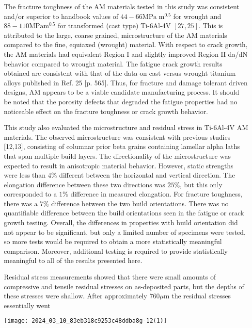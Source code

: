 \documentclass[10pt]{article}
\begin{document}
The fracture toughness of the AM materials tested in this study was consistent and/or superior to handbook values of $44-66 \mathrm{MPa}$ $\mathrm{m}^{0.5}$ for wrought and $88-110 \mathrm{MPa} \mathrm{m}^{0.5}$ for transformed (cast type) Ti-6Al-4V $[27,25]$. This is attributed to the large, coarse grained, microstructure of the AM materials compared to the fine, equiaxed (wrought) material. With respect to crack growth, the AM materials had equivalent Region I and slightly improved Region II da/dN behavior compared to wrought material. The fatigue crack growth results obtained are consistent with that of the data on cast versus wrought titanium alloys published in Ref. 25 [p. 565]. Thus, for fracture and damage tolerant driven designs, AM appears to be a viable candidate manufacturing process. It should be noted that the porosity defects that degraded the fatigue properties had no noticeable effect on the fracture toughness or crack growth behavior.

This study also evaluated the microstructure and residual stress in Ti-6Al-4V AM materials. The observed microstructure was consistent with previous studies [12,13], consisting of columnar prior beta grains containing lamellar alpha laths that span multiple build layers. The directionality of the microstructure was expected to result in anisotropic material behavior. However, static strengths were less than $4 \%$ different between the horizontal and vertical direction. The elongation difference between these two directions was $25 \%$, but this only corresponded to a $1 \%$ difference in measured elongation. For fracture toughness, there was a 7\% difference between the two build orientations. There was no quantifiable difference between the build orientations seen in the fatigue or crack growth testing. Overall, the differences in properties with build orientation did not appear to be significant, but only a limited number of specimens were tested, so more tests would be required to obtain a more statistically meaningful comparison. Moreover, additional testing is required to provide statistically meaningful to all of the results presented here.

Residual stress measurements showed that there were small amounts of compressive and tensile residual stresses on as-deposited parts, but the depths of these stresses were shallow. After approximately $760 \mu \mathrm{m}$ the residual stresses essentially went

\begin{center}
\texttt{[image: 2024\_03\_10\_83eb318c9253c48ddba8g-12(1)]}
\end{center}
\end{document}
